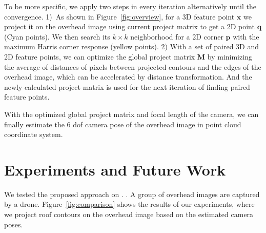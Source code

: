To be more specific, we apply two steps in every iteration alternatively until the convergence. 1)~As shown in Figure~\ref{fig:overview}, for a 3D feature point $\mathbf{x}$ we project it on the overhead image using current project matrix to get a 2D point $\mathbf{q}$ (Cyan points). We then search its $k\times k$ neighborhood for a 2D corner $\mathbf{p}$ with the maximum Harris corner response (yellow points). 
%
%
2) With a set of paired 3D and 2D feature points, we can optimize the global project matrix $\mathbf{M}$ by minimizing the average of distances of pixels between projected contours and the edges of the overhead image, which can be accelerated by distance transformation. 
%
And the newly calculated project matrix is used for the next iteration of finding paired feature points.
%

With the optimized global project matrix and focal length of the camera, we can finally estimate the 6 dof camera pose of the overhead image in point cloud coordinate system.
 

\section{Experiments and Future Work}
We tested the proposed approach on . 
. 
A group of overhead images are captured by a drone.
%
Figure~\ref{fig:comparison} shows the results of our experiments, where we project roof contours on the overhead image based on the estimated camera poses. 
%

